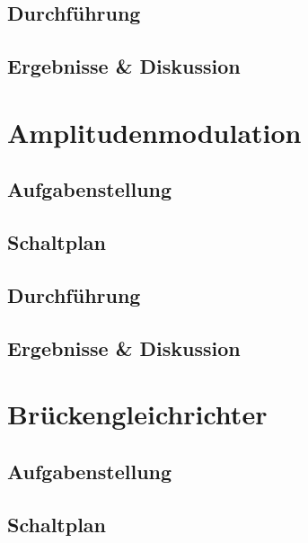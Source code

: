 \documentclass[12pt,a4paper,titlepage]{article}
\begin{document}
\subsection*{Durchf\"uhrung}

\subsection*{Ergebnisse \& Diskussion}

\section{Amplitudenmodulation}

\subsection*{Aufgabenstellung}

\subsection*{Schaltplan}

\subsection*{Durchf\"uhrung}

\subsection*{Ergebnisse \& Diskussion}

\section{Brückengleichrichter}

\subsection*{Aufgabenstellung}

\subsection*{Schaltplan}
\end{document}
